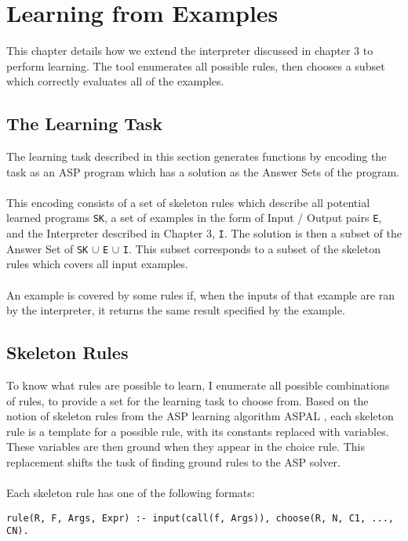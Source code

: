 \chapter{Learning from Examples}

This chapter details how we extend the interpreter discussed in chapter 3 to perform learning. The tool enumerates all possible rules, then chooses a subset which correctly evaluates all of the examples.

\section{The Learning Task}
The learning task described in this section generates functions by encoding the task as an ASP program which has a solution as the Answer Sets of the program.  \\ \\
This encoding consists of a set of skeleton rules which describe all potential learned programs \lstinline!SK!, a set of examples in the form of Input / Output pairs \lstinline!E!, and the Interpreter described in Chapter 3, \lstinline!I!. The solution is then a subset of the Answer Set of \lstinline!SK! $\cup$ \lstinline!E! $\cup$ \lstinline!I!. This subset corresponds to a subset of the skeleton rules which covers all input examples. \\ \\
An example is covered by some rules if, when the inputs of that example are ran by the interpreter, it returns the same result specified by the example.

\section{Skeleton Rules}
To know what rules are possible to learn, I enumerate all possible combinations of rules, to provide a set for the learning task to choose from. Based on the notion of skeleton rules from the ASP learning algorithm ASPAL \cite{Corapi2012}, each skeleton rule is a template for a possible rule, with its constants replaced with variables. These variables are then ground when they appear in the choice rule. This replacement shifts the task of finding ground rules to the ASP solver.\\ \\
Each skeleton rule has one of the following formats: \\

\begin{lstlisting}
rule(R, F, Args, Expr) :- input(call(f, Args)), choose(R, N, C1, ..., CN).
\end{lstlisting}

